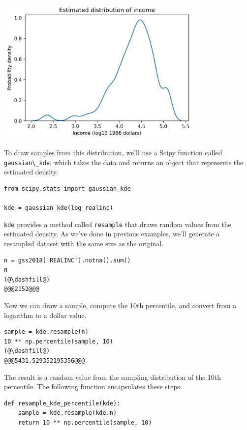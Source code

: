 \begin{center}
\includegraphics[width=4in]{chapters/12_bootstrap_files/12_bootstrap_114_0.png}
\end{center}

To draw samples from this distribution, we'll use a Scipy function
called \passthrough{\lstinline!gaussian\_kde!}, which takes the data and
returns an object that represents the estimated density.

\begin{lstlisting}[]
from scipy.stats import gaussian_kde

kde = gaussian_kde(log_realinc)
\end{lstlisting}

\passthrough{\lstinline!kde!} provides a method called
\passthrough{\lstinline!resample!} that draws random values from the
estimated density. As we've done in previous examples, we'll generate a
resampled dataset with the same size as the original.

\begin{lstlisting}[]
n = gss2018['REALINC'].notna().sum()
n
(@\dashfill@)
@@@2152@@@
\end{lstlisting}

Now we can draw a sample, compute the 10th percentile, and convert from
a logarithm to a dollar value.

\begin{lstlisting}[]
sample = kde.resample(n)
10 ** np.percentile(sample, 10)
(@\dashfill@)
@@@5431.529352195356@@@
\end{lstlisting}

The result is a random value from the sampling distribution of the 10th
percentile. The following function encapsulates these steps.

\begin{lstlisting}[]
def resample_kde_percentile(kde):
    sample = kde.resample(kde.n)
    return 10 ** np.percentile(sample, 10)
\end{lstlisting}


